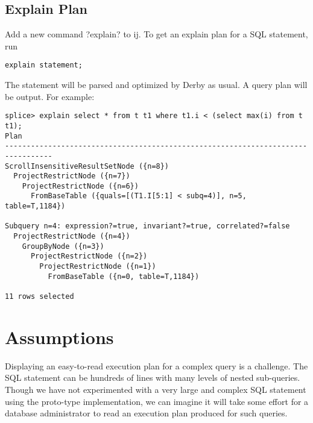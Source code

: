 \documentclass{article}
\begin{document}
\subsection{Explain Plan}
Add a new command ?explain? to ij. To get an explain plan for a SQL statement, run 
\begin{lstlisting}
explain statement;
\end{lstlisting}
The statement will be parsed and optimized by Derby as usual. A query plan will be output. For example:
\begin{lstlisting}
splice> explain select * from t t1 where t1.i < (select max(i) from t  t1);
Plan                                                                                                                            
---------------------------------------------------------------------------------
ScrollInsensitiveResultSetNode ({n=8})                                                                                          
  ProjectRestrictNode ({n=7})                                                                                                   
    ProjectRestrictNode ({n=6})                                                                                                 
      FromBaseTable ({quals=[(T1.I[5:1] < subq=4)], n=5, table=T,1184})                                                         
                                                                                                                                
Subquery n=4: expression?=true, invariant?=true, correlated?=false                                                              
  ProjectRestrictNode ({n=4})                                                                                                   
    GroupByNode ({n=3})                                                                                                         
      ProjectRestrictNode ({n=2})                                                                                               
        ProjectRestrictNode ({n=1})                                                                                             
          FromBaseTable ({n=0, table=T,1184})                                                                                   

11 rows selected

\end{lstlisting}
\section{Assumptions}
Displaying an easy-to-read execution plan for a complex query is a challenge. The SQL statement can be hundreds of lines with many levels of nested sub-queries. Though we have not experimented with a very large and complex SQL statement using the proto-type implementation, we can imagine it will take some effort for a database administrator to read an execution plan produced for such queries.
\end{document}
